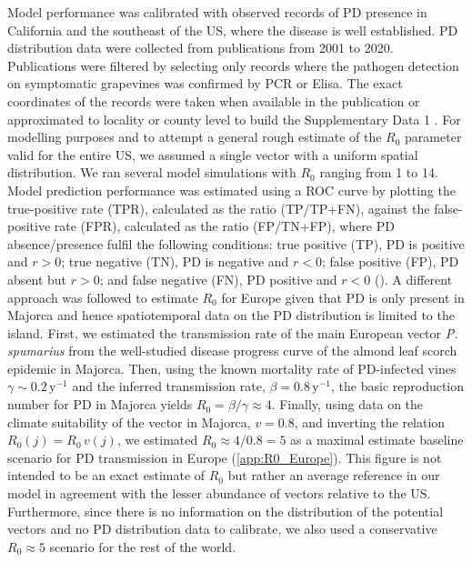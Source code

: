     Model performance was calibrated with observed records of PD presence in
    California and the southeast of the US, where the disease is well
    established.
    PD distribution data were collected from publications from 2001 to 2020.
    Publications were filtered by selecting only records where the pathogen
    detection on symptomatic grapevines was confirmed by PCR or Elisa. The
    exact
    coordinates of the records were taken when available in the publication or
    approximated to locality or county level to build the Supplementary Data 1
    \cite{Overall2015, Vanhove2019, Lieth2011, Anas2008, Hail2009,
        Wallingford2007,
        Myers2007, Albibi1998}. For modelling purposes and to attempt a general
    rough
    estimate of the $R_0$ parameter valid for the entire US, we assumed a
    single
    vector with a uniform spatial distribution. We ran several model
    simulations
    with $R_0$ ranging from 1 to 14.  Model prediction performance was
    estimated
    using a ROC curve by plotting the true-positive rate (TPR), calculated as
    the
    ratio (TP/TP+FN), against the false-positive rate (FPR), calculated as the
    ratio (FP/TN+FP), where PD absence/presence fulfil the following
    conditions:
    true positive (TP), PD is positive and $r>0$;  true negative (TN), PD is
    negative and $r<0$; false positive (FP), PD absent but $r>0$; and false
    negative (FN), PD positive and $r<0$ (\cite{jimenez2012insights}). A
    different
    approach was followed to estimate $R_0$ for Europe given that PD is only
    present in Majorca and hence spatiotemporal data on the PD distribution is
    limited to the island. First, we estimated the transmission rate of the
    main
    European vector \textit{P. spumarius} from the well-studied disease
    progress
    curve of the almond leaf scorch epidemic in Majorca. Then, using the known
    mortality rate of PD-infected vines $\gamma\sim 0.2 \, \textrm{y}^{-1}$ and
    the
    inferred transmission rate, $\beta=0.8 \, \textrm{y}^{-1}$, the basic
    reproduction number for PD in Majorca yields $R_0=\beta/\gamma\approx4$.
    Finally, using data on the climate suitability of the vector in Majorca,
$v=0.8$, and inverting the relation $R_0(j)=R_0\, v(j)$, we estimated
$R_0\approx 4/0.8=5$ as a maximal estimate baseline scenario for PD
    transmission in Europe (\cref{app:R0_Europe}). This figure is not
    intended to be an exact estimate of $R_0$ but rather an average reference
    in
    our model in agreement with the lesser abundance of vectors relative to the
    US.
    Furthermore, since there is no information on the distribution of the
    potential
    vectors and no PD distribution data to calibrate, we also used a
    conservative
$R_0 \approx 5$ scenario for the rest of the world.

